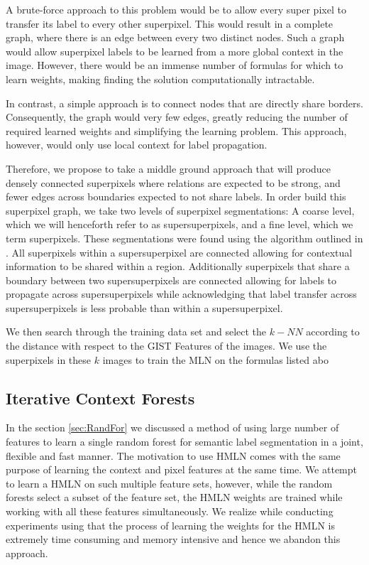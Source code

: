 \documentclass{article} %
\begin{document}
A brute-force approach to this problem would be to allow every super pixel to transfer its label to every other superpixel. This would result in a complete graph, where there is an edge between every two distinct nodes. Such a graph would allow superpixel labels to be learned from a more global context in the image. However, there would be an immense number of formulas for which to learn weights, making finding the solution computationally intractable. 

In contrast, a simple approach is to connect nodes that are directly share borders. Consequently, the graph would very few edges, greatly reducing the number of required learned weights and simplifying the learning problem. This approach, however, would only use local context for label propagation.

Therefore, we propose to take a middle ground approach that will produce densely connected superpixels where relations are expected to be strong, and fewer edges across boundaries expected to not share labels. In order build this superpixel graph, we take two levels of superpixel segmentations: A coarse level, which we will henceforth refer to as supersuperpixels, and a fine level, which we term superpixels. These segmentations were found using the algorithm outlined in \cite{Superpixel}. All superpixels within a supersuperpixel are connected allowing for contextual information to be shared within a region. Additionally superpixels that share a boundary between two supersuperpixels are connected allowing for labels to propagate across supersuperpixels while acknowledging that label transfer across supersuperpixels is less probable than within a supersuperpixel.

We then search through the training data set and select the $k-NN$ according to the distance with respect to the GIST Features \cite{Gist} of the images. We use the superpixels in these $k$ images to train the MLN on the formulas listed abo

\subsection{Iterative Context Forests}
\label{sec:IterContFor}

In the section \ref{sec:RandFor} we discussed a method of using large number of features to learn a single random forest for semantic label segmentation in a joint, flexible and fast manner. The motivation to use HMLN comes with the same purpose of learning the context and pixel features at the same time. We attempt to learn a HMLN on such multiple feature sets, however, while the random forests select a subset of the feature set, the HMLN weights are trained while working with all these features simultaneously. We realize while conducting experiments using \cite{alchemy} that the process of learning the weights for the HMLN is extremely time consuming and memory intensive and hence we abandon this approach. 
\end{document}
